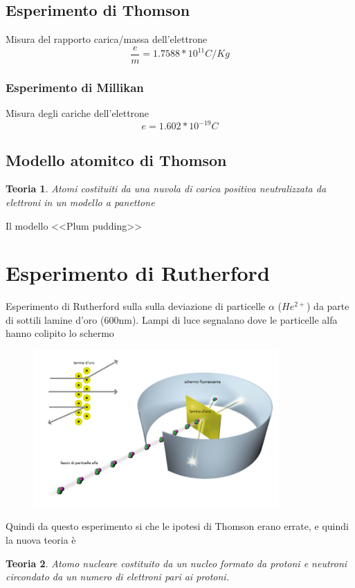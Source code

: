 \documentclass{book}
\newtheorem{Teoria}{Teoria}
\begin{document}
\subsection{Esperimento di Thomson}
Misura del rapporto carica/massa dell'elettrone
\begin{equation}
	\frac{e}{m}=1.7588*10^{11}C/Kg
\end{equation}
\subsubsection{Esperimento di Millikan}
Misura degli cariche dell'elettrone
\begin{equation}
	e=1.602*10^{-19}C
\end{equation}
\subsection{Modello atomitco di Thomson}
\begin{Teoria}
	Atomi costituiti da una nuvola di carica positiva neutralizzata da elettroni in un modello a panettone
\end{Teoria}
Il modello <<Plum pudding>>      
\section{Esperimento di Rutherford}
Esperimento di Rutherford sulla sulla deviazione di particelle $\alpha$ ($He^{2+}$) da parte di sottili lamine d'oro (600nm). Lampi di luce segnalano dove le particelle alfa hanno colipito lo schermo
\begin{figure}[!h]
  	\centering
	\includegraphics[height=6cm]{img/Esperimento di Rutherfor.jpg}
\end{figure}
Quindi da questo esperimento si che le ipotesi di Thomson erano errate, e quindi la nuova teoria è
\begin{Teoria}
	Atomo nucleare costituito da un nucleo formato da protoni e neutroni circondato da un numero di elettroni pari ai protoni.
\end{Teoria}
\end{document}
